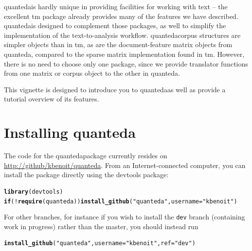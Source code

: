 \documentclass[11pt]{article}\usepackage[]{graphicx}\usepackage[]{color}
\makeatletter
\newcommand{\hlstr}[1]{\textcolor[rgb]{0.192,0.494,0.8}{#1}}%
\newcommand{\hlopt}[1]{\textcolor[rgb]{0,0,0}{#1}}%
\newcommand{\hlstd}[1]{\textcolor[rgb]{0.345,0.345,0.345}{#1}}%
\newcommand{\hlkwa}[1]{\textcolor[rgb]{0.161,0.373,0.58}{\textbf{#1}}}%
\newcommand{\hlkwc}[1]{\textcolor[rgb]{0.333,0.667,0.333}{#1}}%
\newcommand{\hlkwd}[1]{\textcolor[rgb]{0.737,0.353,0.396}{\textbf{#1}}}%
\newenvironment{kframe}{%
 \def\at@end@of@kframe{}%
 \ifinner\ifhmode%
  \def\at@end@of@kframe{\end{minipage}}%
  \begin{minipage}{\columnwidth}%
 \fi\fi%
 \def\FrameCommand##1{\hskip\@totalleftmargin \hskip-\fboxsep
 \colorbox{shadecolor}{##1}\hskip-\fboxsep
     \hskip-\linewidth \hskip-\@totalleftmargin \hskip\columnwidth}%
 \MakeFramed {\advance\hsize-\width
   \@totalleftmargin\z@ \linewidth\hsize
   \@setminipage}}%
 {\par\unskip\endMakeFramed%
 \at@end@of@kframe}
\newenvironment{knitrout}{}{} %
\newcommand{\quanteda}{\textsf{quanteda}}
\makeatother
\begin{document}
\quanteda is hardly unique in providing facilities for working with
text -- the excellent \textsf{tm} package already provides many of the
features we have described.  \quanteda is designed to complement those
packages, as well to simplify the implementation of the
text-to-analysis workflow.  \quanteda corpus structures are simpler
objects than in \textsf{tm}, as are the document-feature matrix
objects from \quanteda, compared to the sparse matrix implementation
found in \textsf{tm}.  However, there is no need to choose only one
package, since we provide translator functions from one matrix or
corpus object to the other in \quanteda.

This vignette is designed to introduce you to \quanteda as well as
provide a tutorial overview of its features.

\section{Installing \quanteda}

The code for the \quanteda package currently resides on
\url{http://github/kbenoit/quanteda}.  From an Internet-connected
computer, you can install the package directly using the
\textsf{devtools} package:

\begin{knitrout}\footnotesize
{}\color{fgcolor}\begin{kframe}
\begin{alltt}
\hlkwd{library}\hlstd{(devtools)}
\hlkwa{if} \hlstd{(}\hlopt{!}\hlkwd{require}\hlstd{(quanteda))} \hlkwd{install_github}\hlstd{(}\hlstr{"quanteda"}\hlstd{,} \hlkwc{username}\hlstd{=}\hlstr{"kbenoit"}\hlstd{)}
\end{alltt}
\end{kframe}
\end{knitrout}

For other branches, for instance if you wish to install the
\texttt{dev} branch (containing work in progress) rather than the
master, you should instead run

\begin{knitrout}\footnotesize
{}\color{fgcolor}\begin{kframe}
\begin{alltt}
\hlkwd{install_github}\hlstd{(}\hlstr{"quanteda"}\hlstd{,} \hlkwc{username}\hlstd{=}\hlstr{"kbenoit"}\hlstd{,} \hlkwc{ref}\hlstd{=}\hlstr{"dev"}\hlstd{)}
\end{alltt}
\end{kframe}
\end{knitrout}
\end{document}
